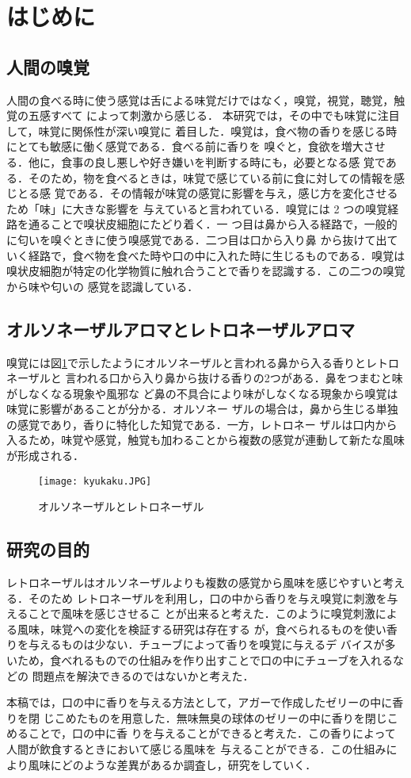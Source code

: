 \section{はじめに}
\subsection{人間の嗅覚}
\label{subsec:intro}
人間の食べる時に使う感覚は舌による味覚だけではなく，嗅覚，視覚，聴覚，触覚の五感すべて
によって刺激から感じる． 本研究では，その中でも味覚に注目して，味覚に関係性が深い嗅覚に
着目した．嗅覚は，食べ物の香りを感じる時にとても敏感に働く感覚である．食べる前に香りを
嗅ぐと，食欲を増大させる．他に，食事の良し悪しや好き嫌いを判断する時にも，必要となる感
覚である．そのため，物を食べるときは，味覚で感じている前に食に対しての情報を感じとる感
覚である．その情報が味覚の感覚に影響を与え，感じ方を変化させるため「味」に大きな影響を
与えていると言われている．嗅覚には 2 つの嗅覚経路を通ることで嗅状皮細胞にたどり着く．一
つ目は鼻から入る経路で，一般的に匂いを嗅ぐときに使う嗅感覚である．二つ目は口から入り鼻
から抜けて出ていく経路で，食べ物を食べた時や口の中に入れた時に生じるものである．嗅覚は
嗅状皮細胞が特定の化学物質に触れ合うことで香りを認識する．この二つの嗅覚から味や匂いの
感覚を認識している．


\subsection{オルソネーザルアロマとレトロネーザルアロマ}
嗅覚には図\ref{kyukaku}で示したようにオルソネーザルと言われる鼻から入る香りとレトロネーザルと
言われる口から入り鼻から抜ける香りの2つがある．鼻をつまむと味がしなくなる現象や風邪な
ど鼻の不具合により味がしなくなる現象から嗅覚は味覚に影響があることが分かる．オルソネー
ザルの場合は，鼻から生じる単独の感覚であり，香りに特化した知覚である．一方，レトロネー
ザルは口内から入るため，味覚や感覚，触覚も加わることから複数の感覚が連動して新たな風味
が形成される．


\begin{figure}[t]
    \centering
    \texttt{[image: kyukaku.JPG]}
    \caption{オルソネーザルとレトロネーザル}
    \label{kyukaku}
  \end{figure}


\subsection{研究の目的}
レトロネーザルはオルソネーザルよりも複数の感覚から風味を感じやすいと考える．そのため
レトロネーザルを利用し，口の中から香りを与え嗅覚に刺激を与えることで風味を感じさせるこ
とが出来ると考えた．このように嗅覚刺激による風味，味覚への変化を検証する研究は存在する
が，食べられるものを使い香りを与えるものは少ない．チューブによって香りを嗅覚に与えるデ
バイスが多いため，食べれるものでの仕組みを作り出すことで口の中にチューブを入れるなどの
問題点を解決できるのではないかと考えた．


本稿では，口の中に香りを与える方法として，アガーで作成したゼリーの中に香りを閉
じこめたものを用意した．無味無臭の球体のゼリーの中に香りを閉じこめることで，口の中に香
りを与えることができると考えた．この香りによって人間が飲食するときにおいて感じる風味を
与えることができる．この仕組みにより風味にどのような差異があるか調査し，研究をしていく．